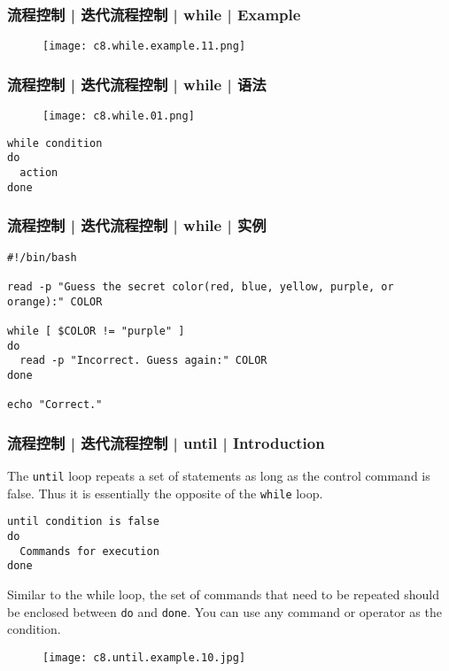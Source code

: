 \begin{frame}
  \frametitle{流程控制 | 迭代流程控制 | while | Example}
  \begin{figure}
    \centering
    \texttt{[image: c8.while.example.11.png]}
  \end{figure}
\end{frame}

\begin{frame}[fragile]
  \frametitle{流程控制 | 迭代流程控制 | while | \alert{语法}}
  \begin{figure}
    \centering
    \texttt{[image: c8.while.01.png]}
  \end{figure}
\begin{lstlisting}
while condition
do
  action
done
\end{lstlisting}
\end{frame}

\begin{frame}[fragile]
  \frametitle{流程控制 | 迭代流程控制 | while | \alert{实例}}
\begin{lstlisting}
#!/bin/bash

read -p "Guess the secret color(red, blue, yellow, purple, or orange):" COLOR 

while [ $COLOR != "purple" ]
do
  read -p "Incorrect. Guess again:" COLOR
done

echo "Correct."
\end{lstlisting}
\end{frame}

\begin{frame}[fragile]
  \frametitle{流程控制 | 迭代流程控制 | until | Introduction}
  The \verb|until| loop repeats a set of statements as long as the control command is false. Thus it is essentially the opposite of the \verb|while| loop.\\
  \vspace{-0.2cm}
\begin{lstlisting}
until condition is false
do
  Commands for execution
done
\end{lstlisting}
  \vspace{-0.1cm}
  Similar to the while loop, the set of commands that need to be repeated should be enclosed between \verb|do| and \verb|done|. You can use any command or operator as the condition.\\
  \vspace{-0.2cm}
  \begin{figure}
    \centering
    \texttt{[image: c8.until.example.10.jpg]}
  \end{figure}
\end{frame}

